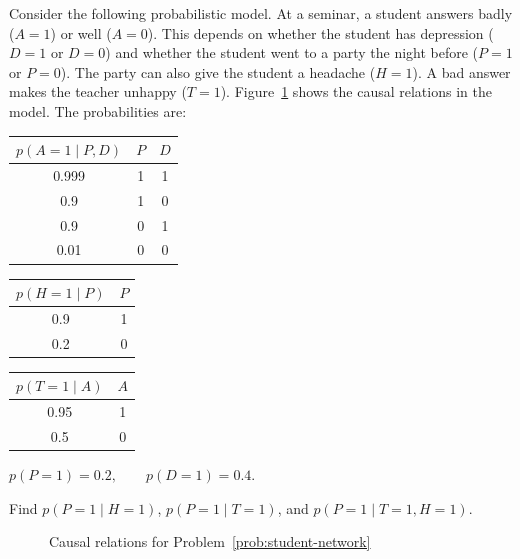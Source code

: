 \label{prob:student-network}
Consider the following probabilistic model. At a seminar, a student answers
badly ($A = 1$) or well ($A = 0$). This depends on whether the student has
depression ($D = 1$ or $D = 0$) and whether the student went to a party the
night before ($P = 1$ or $P = 0$). The party can also give the student a
headache ($H = 1$). A bad answer makes the teacher unhappy ($T = 1$).
Figure~\ref{fig:student-network} shows the causal relations in the model.
The probabilities are:
\begin{center}
  \begin{tabular}[t]{c|cc}
    \toprule
    $p(A = 1 \mid P, D)$ & $P$ & $D$ \\
    \midrule
    0.999 & 1 & 1 \\
    0.9   & 1 & 0 \\
    0.9   & 0 & 1 \\
    0.01  & 0 & 0 \\
    \bottomrule
  \end{tabular}
  \quad
  \begin{tabular}[t]{c|c}
    \toprule
    $p(H = 1 \mid P)$ & $P$ \\
    \midrule
    0.9 & 1 \\
    0.2 & 0 \\
    \bottomrule
  \end{tabular}
  \quad
  \begin{tabular}[t]{c|c}
    \toprule
    $p(T = 1 \mid A)$ & $A$ \\
    \midrule
    0.95 & 1 \\
    0.5  & 0 \\
    \bottomrule
  \end{tabular}

  \medskip
  $p(P = 1) = 0.2, \qquad p(D = 1) = 0.4.$
\end{center}
Find $p(P = 1 \mid H = 1)$, $p(P = 1 \mid T = 1)$, and
$p(P = 1 \mid T = 1, H = 1)$.

\begin{figure}[ht]
  \centering
  \caption{Causal relations for Problem~\ref{prob:student-network}}
  \label{fig:student-network}
\end{figure}

